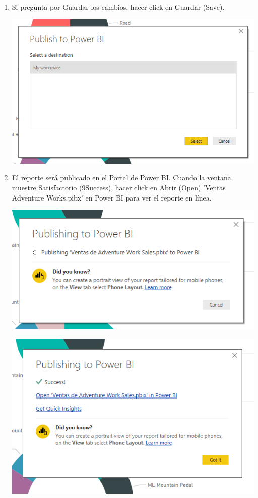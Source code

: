 \begin{itemize}
\begin{enumerate}
\item Si pregunta por Guardar los cambios, hacer click en Guardar (Save).
\begin{center}
\includegraphics[scale=0.55]{./Imagenes/24.png}
\end{center}

\item El reporte será publicado en el Portal de Power BI. Cuando la ventana muestre Satisfactorio (9Success), hacer click en Abrir (Open) 'Ventas Adventure Works.pibx' en Power BI para ver el reporte en línea.
\begin{center}
\includegraphics[scale=0.55]{./Imagenes/25.png}
\end{center}
\begin{center}
\includegraphics[scale=0.55]{./Imagenes/26.png}
\end{center}


\end{enumerate}
\end{itemize}
